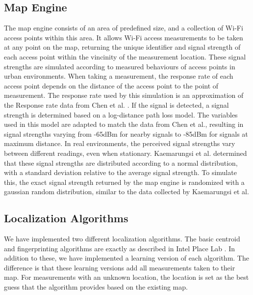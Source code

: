 \documentclass{sig-alternate-br}
\begin{document}
\subsection{Map Engine}
The map engine consists of an area of predefined size, and a collection of Wi-Fi access points within this area. It allows Wi-Fi access measurements to be taken at any point on the map, returning the unique identifier and signal strength of each access point within the vincinity of the measurement location. These signal strengths are simulated according to measured behaviours of access points in urban environments. When taking a measurement, the response rate of each access point depends on the distance of the access point to the point of measurement. The response rate used by this simulation is an approximation of the Response rate data from Chen et al. \cite{cheng:metropolitan-scale}. If the signal is detected, a signal strength is determined based on a log-distance path loss model. The variables used in this model are adapted to match the data from Chen et al., resulting in signal strengths varying from -65dBm for nearby signals to -85dBm for signals at maximum distance. In real environments, the perceived signal strengths vary between different readings, even when stationary. Kaemarungsi et al. determined that these signal strengths are distributed according to a normal distribution, with a standard deviation relative to the average signal strength. To simulate this, the exact signal strength returned by the map engine is randomized with a gaussian random distribution, similar to the data collected by Kaemarungsi et al.

\subsection{Localization Algorithms}
We have implemented two different localization algorithms. The basic centroid and fingerprinting algorithms are exactly as described in Intel Place Lab \cite{cheng:metropolitan-scale}. In addition to these, we have implemented a learning version of each algorithm. The difference is that these learning versions add all measurements taken to their map. For measurements with an unknown location, the location is set as the best guess that the algorithm provides based on the existing map.
\end{document}
